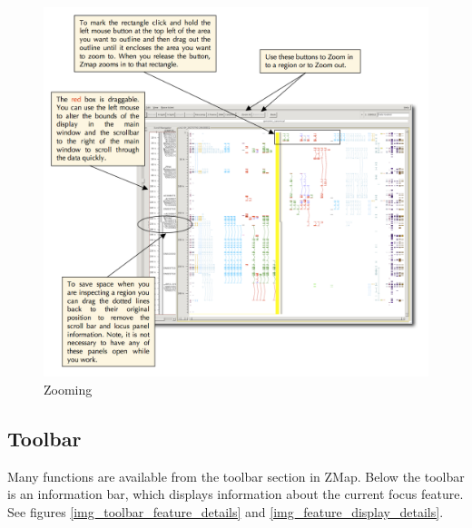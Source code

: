 \documentclass[letterpaper]{article}
\begin{document}
\begin{figure}
\centering
\color[rgb]{0.30980393,0.5058824,0.7411765}
\includegraphics[width=15.231cm]{img_zooming.png}
\caption{Zooming}
\label{img_zooming}
\end{figure}


\subsection{Toolbar} \label{sec_toolbar}
Many functions are available from the toolbar section in ZMap. Below the toolbar is an information bar, which displays information about the current focus feature. See figures \ref{img_toolbar_feature_details} and \ref{img_feature_display_details}.
\end{document}
